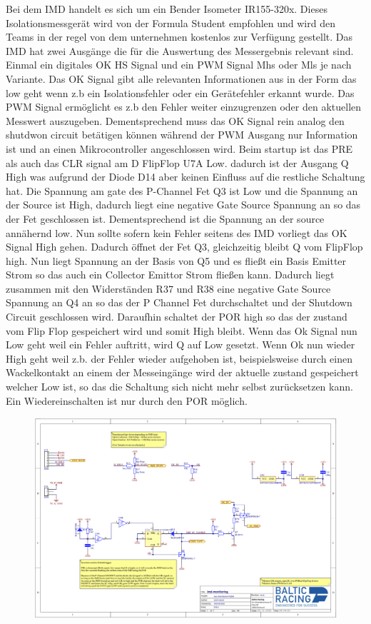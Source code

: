 Bei dem IMD handelt es sich um ein Bender Isometer IR155-320x. Dieses Isolationsmessgerät wird von der Formula Student empfohlen und wird den Teams in der regel von dem unternehmen kostenlos zur Verfügung gestellt.
Das IMD hat zwei Ausgänge die für die Auswertung des Messergebnis relevant sind. Einmal ein digitales OK HS Signal und ein PWM Signal Mhs oder Mls je nach Variante. Das OK Signal gibt alle relevanten Informationen aus in der Form das low geht wenn z.b ein Isolationsfehler oder ein Gerätefehler erkannt wurde. Das PWM Signal ermöglicht es z.b den Fehler weiter einzugrenzen oder den aktuellen Messwert auszugeben. Dementsprechend muss das OK Signal rein analog den shutdwon circuit betätigen können während der PWM Ausgang nur Information ist und an einen Mikrocontroller angeschlossen wird. Beim startup ist das PRE als auch das CLR signal am D FlipFlop U7A Low. dadurch ist der Ausgang Q High was aufgrund der Diode D14 aber keinen Einfluss auf die restliche Schaltung hat. Die Spannung am gate des P-Channel Fet Q3 ist Low und die Spannung an der Source ist High, dadurch liegt eine negative Gate Source Spannung an so das der Fet geschlossen ist. Dementsprechend ist die Spannung an der source annähernd low. Nun sollte sofern kein Fehler seitens des IMD vorliegt das OK Signal High gehen. Dadurch öffnet der Fet Q3, gleichzeitig bleibt Q vom FlipFlop high. Nun liegt Spannung an der Basis von Q5 und es fließt ein Basis Emitter Strom so das auch ein Collector Emittor Strom fließen kann. Dadurch liegt zusammen mit den Widerständen R37 und R38 eine negative Gate Source Spannung an Q4 an so das der P Channel Fet durchschaltet und der Shutdown Circuit geschlossen wird. Daraufhin schaltet der POR high so das der zustand vom Flip Flop gespeichert wird und somit High bleibt. Wenn das Ok Signal nun Low geht weil ein Fehler auftritt, wird Q auf Low gesetzt. Wenn Ok nun wieder High geht weil z.b. der Fehler wieder aufgehoben ist, beispielsweise durch einen Wackelkontakt an einem der Messeingänge wird der aktuelle zustand gespeichert welcher Low ist, so das die Schaltung sich nicht mehr selbst zurücksetzen kann. Ein Wiedereinschalten ist nur durch den POR möglich.


\begin{figure}
	\centering
	\includegraphics[width=0.7\linewidth]{"bilder/IMD Monitoring schematic"}
	\caption{}
	\label{fig:imd-monitoring-schematic}
\end{figure}


